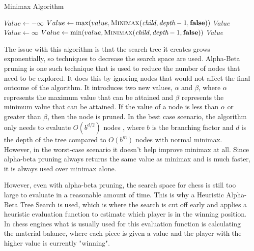 \begin{algorithm}[h]
    \caption{Minimax Algorithm}
    \begin{algorithmic}
        \State \Return {}
        \EndIf
        \State $Value \gets -\infty$
        \State $Value \gets \max(value, \textsc{Minimax}(\textit{child}, \textit{depth} - 1, \textbf{false}))$
        \EndFor
        \State \Return $Value$
        \Else
        \State $Value \gets \infty$
        \State $Value \gets \min(value, \textsc{Minimax}(\textit{child}, \textit{depth} - 1, \textbf{false}))$
        \EndFor
        \State \Return $Value$
        \EndIf
        \EndFunction
    \end{algorithmic}
\end{algorithm}
The issue with this algorithm is that the search tree it creates grows exponentially, so techniques to decrease the search space are used. Alpha-Beta pruning is one such technique that is used to reduce the number of nodes that need to be explored. It does this by ignoring nodes that would not affect the final outcome of the algorithm. It introduces two new values, ${\alpha}$ and ${\beta}$, where ${\alpha}$ represents the maximum value that can be attained and ${\beta}$ represents the minimum value that can be attained. If the value of a node is less than ${\alpha}$ or greater than ${\beta}$, then the node is pruned. In the best case scenario, the algorithm only needs to evaluate ${O(b^{d/2})}$ nodes \cite{russellArtificialIntelligenceModern2022}, where ${b}$ is the branching factor and ${d}$ is the depth of the tree compared to ${O(b^m)}$ nodes with normal minimax. However, in the worst-case scenario it doesn't help improve minimax at all. Since alpha-beta pruning always returns the same value as minimax and is much faster, it is always used over minimax alone.

However, even with alpha-beta pruning, the search space for chess is still too large to evaluate in a reasonable amount of time.  This is why a Heuristic Alpha-Beta Tree Search is used, which is where the search is cut off early and applies a heuristic evaluation function to estimate which player is in the winning position. In chess engines what is usually used for this evaluation function is calculating the material balance, where each piece is given a value and the player with the higher value is currently "winning".

